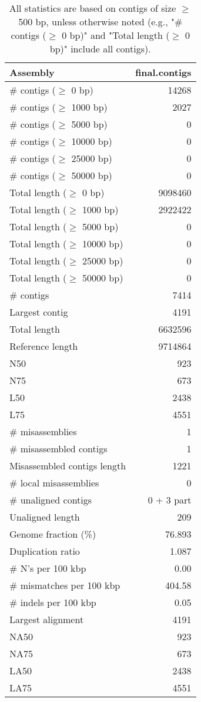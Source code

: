 \documentclass[12pt,a4paper]{article}
\begin{document}
\begin{table}[ht]
\begin{center}
\caption{All statistics are based on contigs of size $\geq$ 500 bp, unless otherwise noted (e.g., "\# contigs ($\geq$ 0 bp)" and "Total length ($\geq$ 0 bp)" include all contigs).}
\begin{tabular}{|l*{1}{|r}|}
\hline
Assembly & final.contigs \\ \hline
\# contigs ($\geq$ 0 bp) & 14268 \\ \hline
\# contigs ($\geq$ 1000 bp) & 2027 \\ \hline
\# contigs ($\geq$ 5000 bp) & 0 \\ \hline
\# contigs ($\geq$ 10000 bp) & 0 \\ \hline
\# contigs ($\geq$ 25000 bp) & 0 \\ \hline
\# contigs ($\geq$ 50000 bp) & 0 \\ \hline
Total length ($\geq$ 0 bp) & 9098460 \\ \hline
Total length ($\geq$ 1000 bp) & 2922422 \\ \hline
Total length ($\geq$ 5000 bp) & 0 \\ \hline
Total length ($\geq$ 10000 bp) & 0 \\ \hline
Total length ($\geq$ 25000 bp) & 0 \\ \hline
Total length ($\geq$ 50000 bp) & 0 \\ \hline
\# contigs & 7414 \\ \hline
Largest contig & 4191 \\ \hline
Total length & 6632596 \\ \hline
Reference length & 9714864 \\ \hline
N50 & 923 \\ \hline
N75 & 673 \\ \hline
L50 & 2438 \\ \hline
L75 & 4551 \\ \hline
\# misassemblies & 1 \\ \hline
\# misassembled contigs & 1 \\ \hline
Misassembled contigs length & 1221 \\ \hline
\# local misassemblies & 0 \\ \hline
\# unaligned contigs & 0 + 3 part \\ \hline
Unaligned length & 209 \\ \hline
Genome fraction (\%) & 76.893 \\ \hline
Duplication ratio & 1.087 \\ \hline
\# N's per 100 kbp & 0.00 \\ \hline
\# mismatches per 100 kbp & 404.58 \\ \hline
\# indels per 100 kbp & 0.05 \\ \hline
Largest alignment & 4191 \\ \hline
NA50 & 923 \\ \hline
NA75 & 673 \\ \hline
LA50 & 2438 \\ \hline
LA75 & 4551 \\ \hline
\end{tabular}
\end{center}
\end{table}
\end{document}
